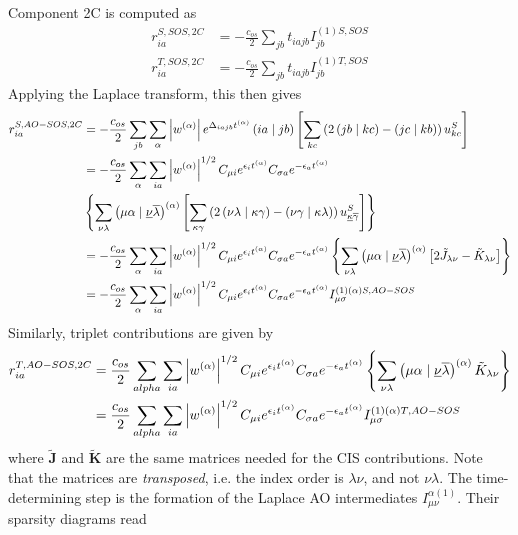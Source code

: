 Component 2C is computed as
\begin{align}
r_{ia}^{S,SOS,2C} &= -\frac{c_{os}}{2} \sum_{jb} t_{iajb} I^{(1)S,SOS}_{jb} \\
r_{ia}^{T,SOS,2C} &= -\frac{c_{os}}{2} \sum_{jb} t_{iajb} I^{(1)T,SOS}_{jb}
\end{align}
\noindent Applying the Laplace transform, this then gives
\begin{align}
\begin{split}
r_{ia}^{S,AO-SOS,2C} &= -\frac{c_{os}}{2} \sum_{jb} \sum_{\alpha} \left\lvert w^{(\alpha)} \right\rvert e^{\Delta_{iajb}t^{(\alpha)}} \left( ia \mid jb \right) \left[\sum_{kc} \left(2\left( jb \mid kc \right) - \left( jc \mid kb \right) \right) u_{kc}^S \right] \\
&=  -\frac{c_{os}}{2} \sum_{\alpha} \sum_{ia} \left\lvert w^{(\alpha)} \right\rvert^{1/2} C_{\mu i} e^{\epsilon_i t^{(\alpha)}} C_{\sigma a} e^{-\epsilon_a t^{(\alpha)}} \\
&\left\lbrace \sum_{\nu\lambda} \left( \mu\alpha \mid \underline{\nu}\overline{\lambda} \right)^{(\alpha)} \left[ \sum_{\kappa\gamma}  \left( 2\left( \nu\lambda \mid \kappa\gamma \right) - \left( \nu\gamma \mid \kappa\lambda \right)\right) u^S_{\underline{\kappa}\overline{\gamma}} \right] \right\rbrace \\
&=   -\frac{c_{os}}{2} \sum_{\alpha} \sum_{ia} \left\lvert w^{(\alpha)} \right\rvert^{1/2} C_{\mu i} e^{\epsilon_i t^{(\alpha)}} C_{\sigma a} e^{-\epsilon_a t^{(\alpha)}} \left\lbrace \sum_{\nu\lambda} \left( \mu\alpha \mid \underline{\nu}\overline{\lambda} \right)^{(\alpha)} \left[ 2\tilde{J}_{\lambda\nu} - \tilde{K}_{\lambda\nu} \right] \right\rbrace \\
&= -\frac{c_{os}}{2} \sum_{\alpha} \sum_{ia} \left\lvert w^{(\alpha)} \right\rvert^{1/2} C_{\mu i} e^{\epsilon_i t^{(\alpha)}} C_{\sigma a} e^{-\epsilon_a t^{(\alpha)}} I^{(1)(\alpha)S,AO-SOS}_{\mu \sigma}
\end{split} 
\end{align}
\noindent Similarly, triplet contributions are given by
\begin{align}
\begin{split}
r_{ia}^{T,AO-SOS,2C} &= \frac{c_{os}}{2} \sum_{alpha} \sum_{ia} \left\lvert w^{(\alpha)} \right\rvert^{1/2} C_{\mu i} e^{\epsilon_i t^{(\alpha)}} C_{\sigma a} e^{-\epsilon_a t^{(\alpha)}} \left\lbrace \sum_{\nu\lambda} \left( \mu\alpha \mid \underline{\nu}\overline{\lambda} \right)^{(\alpha)} \tilde{K}_{\lambda\nu} \right\rbrace \\
&= \frac{c_{os}}{2} \sum_{alpha} \sum_{ia} \left\lvert w^{(\alpha)} \right\rvert^{1/2} C_{\mu i} e^{\epsilon_i t^{(\alpha)}} C_{\sigma a} e^{-\epsilon_a t^{(\alpha)}} I^{(1)(\alpha)T,AO-SOS}_{\mu \sigma}
\end{split}
\end{align}
\noindent where $\mathbf{\tilde{J}}$ and $\mathbf{\tilde{K}}$ are the same matrices needed for the CIS contributions. Note that the matrices are \emph{transposed}, i.e. the index order is $\lambda\nu$, and not $\nu\lambda$. The time-determining step is the formation of the Laplace AO intermediates $I_{\mu\nu}^{\alpha(1)}$. Their sparsity diagrams read

